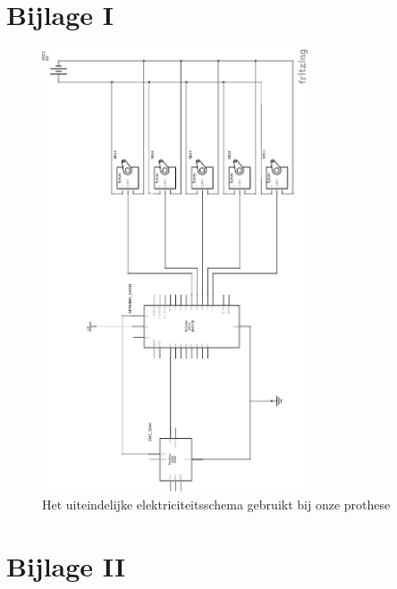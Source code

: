 \hypertarget{bijlage-i}{%
\section*{Bijlage I}\label{bijlage-i}}

\begin{figure}
\centering
\includegraphics[width=0.7\textwidth,height=\textheight]{img/image_27_rot.png}
\caption{Het uiteindelijke elektriciteitsschema gebruikt bij onze
prothese\label{fig:ee}}
\end{figure}

\pagebreak

\hypertarget{bijlage-ii}{%
\section*{Bijlage II}\label{bijlage-ii}}

